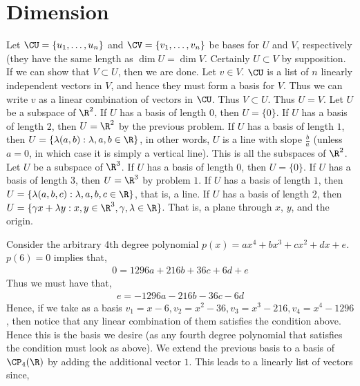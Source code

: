 \documentclass{book}
\begin{document}
\section{Dimension}
  \begin{enumerate}[label=\arabic*)]
    \ii Let $\CU = \{u_1, \dots, u_n\}$ and $\CV = \{v_1, \dots, v_n\}$ be bases for $U$ and $V$, respectively (they have the same length as $\dim U = \dim V$. Certainly $U
    \subset V$ by supposition. If we can show that $V \subset U$, then we are done. Let $v \in V$. $\CU$ is a list of $n$ linearly independent vectors in $V$, and hence they
    must form a basis for $V$. Thus we can write $v$ as a linear combination of vectors in $\CU$. Thus $V \subset U$. Thus $U = V$.
    \ii Let $U$ be a subspace of $\R^2$. If $U$ has a basis of length $0$, then $U = \{0\}$. If $U$ has a basis of length $2$, then $U = \R^2$ by the previous problem. If $U$
    has a basis of length $1$, then $U = \{\lambda(a, b): \lambda, a, b \in \R\}$, in other words, $U$ is a line with slope $\frac{b}{a}$ (unless $a = 0$, in which case it is
    simply a vertical line). This is all the subspaces of $\R^2$.
    \ii Let $U$ be a subspace of $\R^3$. If $U$ has a basis of length $0$, then $U = \{0\}$. If $U$ has a basis of length $3$, then $U = \R^3$ by problem $1$. If $U$
    has a basis of length $1$, then $U = \{\lambda(a, b, c): \lambda, a, b, c \in \R\}$, that is, a line. If $U$ has a basis of length $2$, then $U = \{\gamma x + \lambda y:
    x, y \in \R^3, \gamma, \lambda \in \R\}$. That is, a plane through $x$, $y$, and the origin.
    \ii 
    \begin{enumerate}[label=\arabic*)]
      \ii 
        Consider the arbitrary 4th degree polynomial $p(x) = ax^4 + bx^3 + cx^2 + dx + e$. $p(6) = 0$ implies that,
        \begin{align*}
          0 = 1296a + 216b + 36c + 6d + e
        \end{align*}
        Thus we must have that,
        \begin{align*}
          e = -1296a - 216b - 36c - 6d 
        \end{align*}
        Hence, if we take as a basis $v_1 = x - 6, v_2 = x^2 - 36, v_3 = x^3 - 216, v_4 = x^4 - 1296$, then notice that any linear combination of them satisfies the condition
        above. Hence this is the basis we desire (as any fourth degree polynomial that satisfies the condition must look as above).
      \ii
        We extend the previous basis to a basis of $\CP_4(\R)$ by adding the additional vector $1$. This leads to a linearly list of vectors since,

\end{enumerate}
\end{enumerate}
\end{document}
